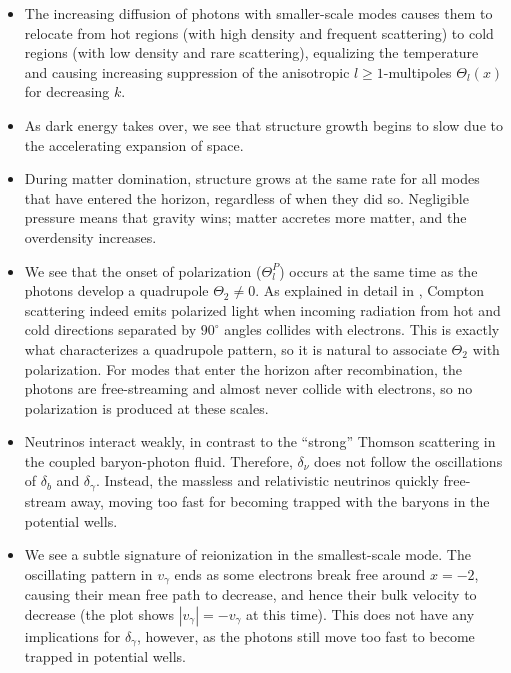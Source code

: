 \documentclass[10pt,a4paper]{article}
\begin{document}
\begin{itemize}
\item
The increasing diffusion of photons with smaller-scale modes
causes them to relocate
from hot regions (with high density and frequent scattering)
to cold regions (with low density and rare scattering),
equalizing the temperature and causing increasing suppression of the anisotropic $l \geq 1$-multipoles $\Theta_l(x)$ for decreasing $k$.

\item
As dark energy takes over,
we see that structure growth begins to slow due to the accelerating expansion of space.

\item
During matter domination,
structure grows at the same rate for all modes that have entered the horizon,
regardless of when they did so.
Negligible pressure means that gravity wins; matter accretes more matter, and the overdensity increases.

\item
We see that the onset of polarization ($\Theta^P_l$) occurs at the same time as the photons develop a quadrupole $\Theta_2 \neq 0$.
As explained in detail in \cite[section 10.2]{dodelsonModernCosmology2021},
Compton scattering indeed emits polarized light
when incoming radiation from hot and cold directions separated by $90^\circ$ angles
collides with electrons.
This is exactly what characterizes a quadrupole pattern,
so it is natural to associate $\Theta_2$ with polarization.
For modes that enter the horizon after recombination,
the photons are free-streaming and almost never collide with electrons,
so no polarization is produced at these scales.

\item
Neutrinos interact weakly, in contrast to the ``strong'' Thomson scattering in the coupled baryon-photon fluid.
Therefore, $\delta_\nu$ does not follow the oscillations of $\delta_b$ and $\delta_\gamma$.
Instead, the massless and relativistic neutrinos quickly free-stream away, moving too fast for becoming trapped with the baryons in the potential wells.

\item
We see a subtle signature of reionization in the smallest-scale mode.
The oscillating pattern in $v_\gamma$ ends as some electrons break free around $x=-2$,
causing their mean free path to decrease, and hence their bulk velocity to decrease (the plot shows $|v_\gamma| = -v_\gamma$ at this time).
This does not have any implications for $\delta_\gamma$, however,
as the photons still move too fast to become trapped in potential wells.


\end{itemize}
\end{document}
